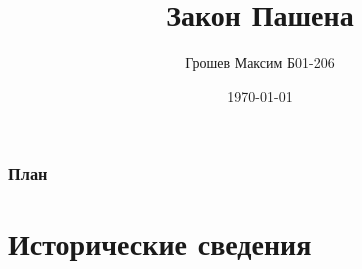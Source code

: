\documentclass{beamer}
\title[Закон Пашена]{Закон Пашена} %
\author{Грошев Максим Б01-206} %
\institute[МФТИ] %
{
Московский физико-технический институт \\ %
}
\date{\today} %
\begin{document}
\begin{frame}
\titlepage %
\end{frame}

\begin{frame}
\frametitle{План} %
\tableofcontents %
\end{frame}


\section{Исторические сведения} %

\end{document}
